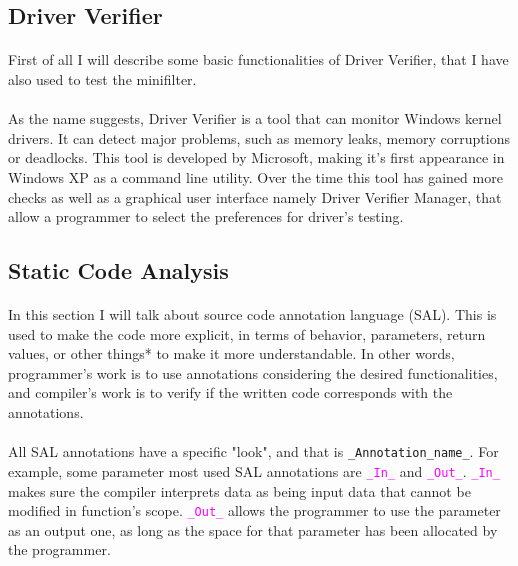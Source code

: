 		\subsection{Driver Verifier}
		\paragraph{}
		First of all I will describe some basic functionalities of Driver Verifier, that I have also used to test the minifilter.
		
		\paragraph{}
		As the name suggests, Driver Verifier is a tool that can monitor Windows kernel drivers. It can detect major problems, such as memory leaks, memory corruptions or deadlocks. This tool is developed by Microsoft, making it's first appearance in Windows XP as a command line utility. Over the time this tool has gained more checks as well as a graphical user interface namely Driver Verifier Manager, that allow a programmer to select the preferences for driver's testing.
		
		\subsection{Static Code Analysis}
		\paragraph{}
		In this section I will talk about source code annotation language (SAL). This is used to make the code more explicit, in terms of behavior, parameters, return values, or other things* to make it more understandable. In other words, programmer's work is to use annotations considering the desired functionalities, and compiler's work is to verify if the written code corresponds with the annotations. 
		
		\paragraph{}
		All SAL annotations have a specific "look", and that is \texttt{\_Annotation\_name\_}. For example, some parameter most used SAL annotations are \textcolor{magenta}{\texttt{\_In\_}} and \textcolor{magenta}{\texttt{\_Out\_}}. \textcolor{magenta}{\texttt{\_In\_}} makes sure the compiler interprets data as being input data that cannot be modified in function's scope. \textcolor{magenta}{\texttt{\_Out\_}} allows the programmer to use the parameter as an output one, as long as the space for that parameter has been allocated by the programmer.
		
